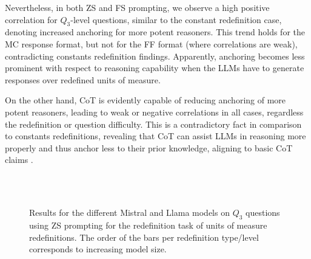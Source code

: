 Nevertheless, in both ZS and FS prompting, we observe a high positive correlation for $Q_3$-level questions, similar to the constant redefinition case, denoting increased anchoring for more potent reasoners. This trend holds for the MC response format, but not for the FF format (where correlations are weak), contradicting constants redefinition findings. Apparently, anchoring becomes less prominent with respect to reasoning capability when the LLMs have to generate responses over redefined units of measure. 


On the other hand, CoT is evidently capable of reducing anchoring of more potent reasoners, leading to weak or negative correlations in all cases, regardless the redefinition or question difficulty. This is  a contradictory fact in comparison to constants redefinitions, revealing that CoT can assist LLMs in reasoning more properly and thus anchor less to their prior knowledge, aligning to basic CoT claims \cite{step-by-step}.

\begin{figure}[h!]
    \centering
       \\
     \\
        \vskip -0.01in
    \caption{Results for the different Mistral and Llama models on $Q_3$ questions using ZS prompting for the
redefinition task of units of measure redefinitions. The order of the bars per redefinition type/level corresponds to increasing model size.}
    \label{fig:size_comparison_units}
\end{figure}



